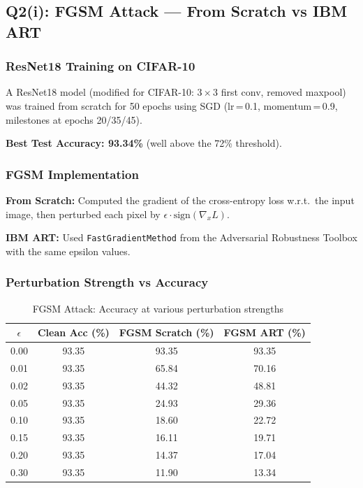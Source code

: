 \documentclass[12pt,a4paper]{article}
\begin{document}
\subsection{Q2(i): FGSM Attack --- From Scratch vs IBM ART}

\subsubsection{ResNet18 Training on CIFAR-10}
A ResNet18 model (modified for CIFAR-10: $3\times3$ first conv, removed maxpool) was trained from scratch for 50 epochs using SGD (lr\,=\,0.1, momentum\,=\,0.9, milestones at epochs 20/35/45).

\textbf{Best Test Accuracy: 93.34\%} (well above the 72\% threshold).

\subsubsection{FGSM Implementation}
\textbf{From Scratch:} Computed the gradient of the cross-entropy loss w.r.t.\ the input image, then perturbed each pixel by $\epsilon \cdot \text{sign}(\nabla_x L)$.

\textbf{IBM ART:} Used \texttt{FastGradientMethod} from the Adversarial Robustness Toolbox with the same epsilon values.

\subsubsection{Perturbation Strength vs Accuracy}

\begin{table}[H]
\centering
\caption{FGSM Attack: Accuracy at various perturbation strengths}
\begin{tabular}{cccc}
\toprule
$\epsilon$ & Clean Acc (\%) & FGSM Scratch (\%) & FGSM ART (\%) \\
\midrule
0.00 & 93.35 & 93.35 & 93.35 \\
0.01 & 93.35 & 65.84 & 70.16 \\
0.02 & 93.35 & 44.32 & 48.81 \\
0.05 & 93.35 & 24.93 & 29.36 \\
0.10 & 93.35 & 18.60 & 22.72 \\
0.15 & 93.35 & 16.11 & 19.71 \\
0.20 & 93.35 & 14.37 & 17.04 \\
0.30 & 93.35 & 11.90 & 13.34 \\
\bottomrule
\end{tabular}
\end{table}
\end{document}
